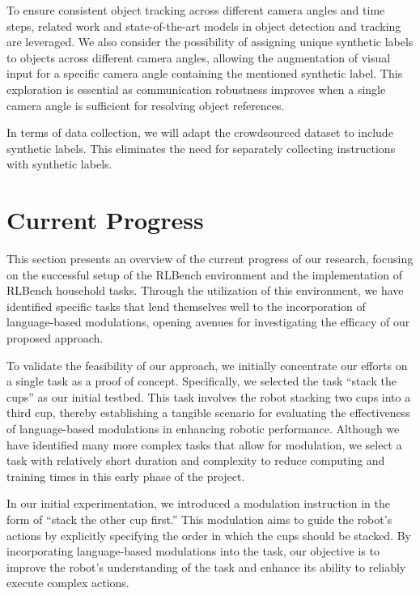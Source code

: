 \documentclass[journal]{IEEEtran}
\begin{document}
To ensure consistent object tracking across different camera angles 
and time steps, related work and state-of-the-art models in object 
detection and tracking are leveraged. We also consider the 
possibility of assigning unique synthetic labels to objects 
across different camera angles, allowing the augmentation of 
visual input for a specific camera angle containing the mentioned 
synthetic label. This exploration is essential as communication 
robustness improves when a single camera angle is sufficient for 
resolving object references.

In terms of data collection, we will adapt the crowdsourced 
dataset to include synthetic labels. This eliminates the need
for separately collecting instructions with synthetic 
labels. 

\section{Current Progress}

This section presents an overview of the current progress of our 
research, focusing on the successful setup of the RLBench environment
and the implementation of RLBench household tasks. Through the utilization
of this environment, we have identified specific tasks that lend themselves
well to the incorporation of language-based modulations, opening avenues 
for investigating the efficacy of our proposed approach.

To validate the feasibility of our approach, we initially concentrate our 
efforts on a single task as a proof of concept. Specifically, we selected 
the task ``stack the cups'' as our initial testbed. This task involves the
robot stacking two cups into a third cup, thereby establishing a tangible 
scenario for evaluating the effectiveness of language-based modulations in
enhancing robotic performance. Although we have identified many more complex
tasks that allow for modulation, we select a task with relatively short duration
and complexity to reduce computing and training times in this early
phase of the project.

In our initial experimentation, we introduced a modulation instruction in the 
form of ``stack the other cup first.'' This modulation aims to guide the robot's
actions by explicitly specifying the order in which the cups should be stacked. 
By incorporating language-based modulations into the task, our objective is to 
improve the robot's understanding of the task and enhance its ability
to reliably execute complex actions.
\end{document}
